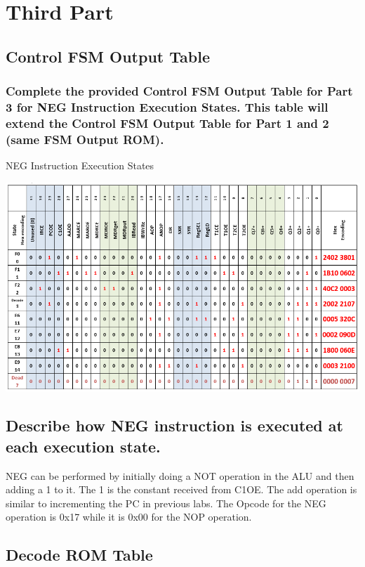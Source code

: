 \documentclass{article}
\begin{document}
	\pagebreak
	
	\section{Third Part}
	\subsection{Control FSM Output Table}
	\subsubsection{Complete the provided Control FSM Output Table for Part 3 for NEG Instruction Execution States. This table will extend the Control FSM Output Table for Part 1 and 2 (same FSM Output ROM).}
	\begin{table}[!ht]
		\centering
		\caption{NEG Instruction Execution States}
		\vspace{0.2cm}
		\includegraphics[width=\linewidth]{neg_instruction.png}
	\end{table}

	\subsection{Describe how NEG instruction is executed at each execution state.}
	NEG can be performed by initially doing a NOT operation in the ALU and then adding a 1 to it.
	The 1 is the constant received from C1OE.
	The add operation is similar to  incrementing the PC in previous labs.
	The Opcode for the NEG operation is 0x17 while it is 0x00 for the NOP operation.
	
	\pagebreak
	
	\subsection{Decode ROM Table}
\end{document}
